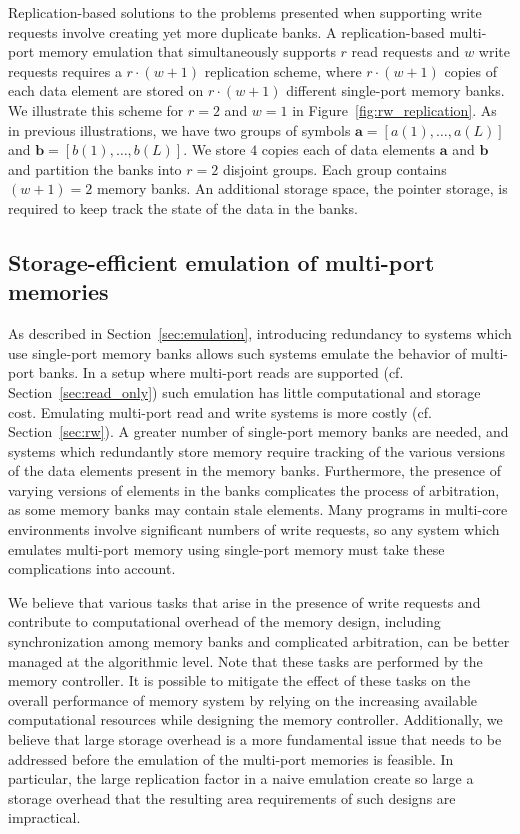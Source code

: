 Replication-based solutions to the problems presented when supporting write requests involve creating yet more duplicate banks. A replication-based multi-port memory emulation that simultaneously supports $r$ read requests and $w$ write requests requires a $r\cdot(w + 1)$ replication scheme, where $r\cdot(w+1)$ copies of each data element are stored on $r\cdot(w + 1)$ different single-port memory banks. We illustrate this scheme for $r = 2$ and $w = 1$ in Figure~\ref{fig:rw_replication}. As in previous illustrations, we have two groups of symbols $\mathbf{a} = [a(1),\ldots, a(L)]$ and $\mathbf{b}  = [b(1),\ldots, b(L)]$. We store $4$ copies each of data elements $\mathbf{a}$ and $\mathbf{b}$ and partition the banks into $r = 2$ disjoint groups. Each group contains $(w + 1) = 2$ memory banks. An additional storage space, the pointer storage, is required to keep track the state of the data in the banks.


\subsection{Storage-efficient emulation of multi-port memories}
\label{sec:efficient_emulation}

As described in Section~\ref{sec:emulation}, introducing redundancy to systems which use single-port memory banks allows such systems emulate the behavior of multi-port banks. In a setup where multi-port reads are supported (cf. Section~\ref{sec:read_only}) such emulation has little computational and storage cost. Emulating multi-port read and write systems is more costly (cf. Section~\ref{sec:rw}). A greater number of single-port memory banks are needed, and systems which redundantly store memory require tracking of the various versions of the data elements present in the memory banks. Furthermore, the presence of varying versions of elements in the banks complicates the process of arbitration, as some memory banks may contain stale elements. Many programs in multi-core environments involve significant numbers of write requests, so any system which emulates multi-port memory using single-port memory must take these complications into account.

{\color{red}We believe that various tasks that arise in the presence of write requests and contribute to computational overhead of the memory design, including synchronization among memory banks and complicated arbitration, can be better managed at the algorithmic level. Note that these tasks are performed by the memory controller. It is possible to mitigate the effect of these tasks on the overall performance of memory system by relying on the increasing available computational resources while designing the memory controller. Additionally, we believe that large storage overhead is a more fundamental issue that needs to be addressed before the emulation of the multi-port memories is feasible. In particular, the large replication factor in a naive emulation create so large a storage overhead that the resulting area requirements of such designs are impractical.}

